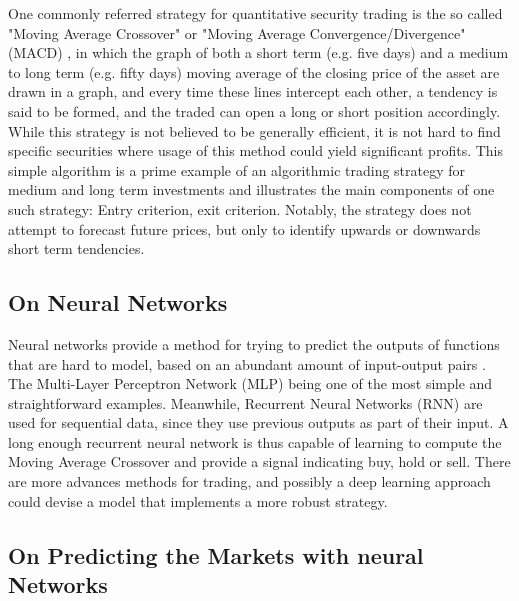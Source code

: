 \documentclass[conference]{IEEEtran}
\begin{document}
One commonly referred strategy for quantitative security trading is the so called "Moving Average Crossover" or "Moving Average Convergence/Divergence" (MACD) \cite{dunis2004applied}, in which the graph of both a short term (e.g. five days) and a medium to long term (e.g. fifty days) moving average of the closing price of the asset are drawn in a graph, and every time these lines intercept each other, a tendency is said to be formed, and the traded can open a long or short position accordingly. While this strategy is not believed to be generally efficient, it is not hard to find specific securities where usage of this method could yield significant profits. This simple algorithm is a prime example of an algorithmic trading strategy for medium and long term investments and illustrates the main components of one such strategy: Entry criterion, exit criterion. Notably, the strategy does not attempt to forecast future prices, but only to identify upwards or downwards short term tendencies.

\subsection{On Neural Networks}

Neural networks provide a method for trying to predict the outputs of functions that are hard to model, based on an abundant amount of input-output pairs \cite{haykin2010neural}. The Multi-Layer Perceptron Network (MLP) being one of the most simple and straightforward examples. Meanwhile, Recurrent Neural Networks (RNN) are used for sequential data, since they use previous outputs as part of their input. A long enough recurrent neural network is thus capable of learning to compute the Moving Average Crossover and provide a signal indicating buy, hold or sell. There are more advances methods for trading, and possibly a deep learning approach could devise a model that implements a more robust strategy.

\subsection{On Predicting the Markets with neural Networks}
\end{document}
